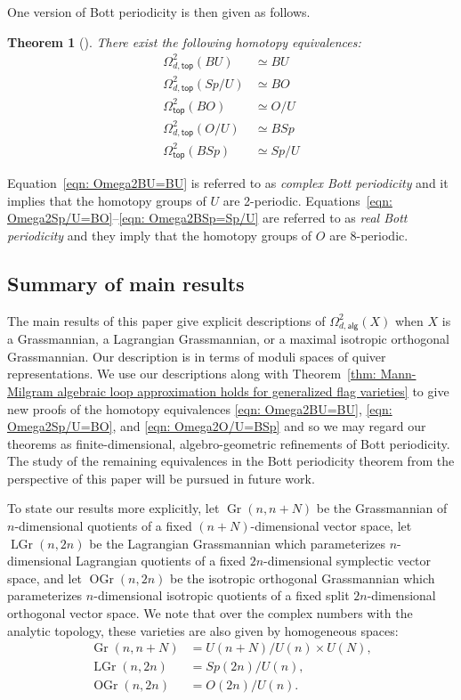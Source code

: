 \message{ !name(Bryan-Vakil.tex)}\documentclass{amsart}
\newtheorem{theorem}{Theorem}[section]
\theoremstyle{definition}
\newcommand{\alg}{\mathsf{alg}}
\renewcommand{\top}{\mathsf{top}}
\newcommand{\Gr}{\operatorname{Gr}}
\newcommand{\LGr}{\operatorname{LGr}}
\newcommand{\OGr}{\operatorname{OGr}}
\newcommand{\LoopTwo}{\Omega^{2}_{d,\alg}}
\newcommand{\LoopTwoTop}{\Omega^{2}_{d,\top}}
\newcommand{\NoDLoopTwoTop}{\Omega^{2}_{\top}}
\newcommand{\homotopyeq}{\simeq}
\begin{document}
One version of Bott periodicity is then given as follows.

\begin{theorem}[\cite{Bott-Periodicity-1959}]\label{thm: classical Bott periodicity as homotopy equivalences}
There exist the following homotopy equivalences:
\begin{align}
\LoopTwoTop (BU)&\homotopyeq BU \label{eqn: Omega2BU=BU}\\
\LoopTwoTop (Sp/U)&\homotopyeq BO  \label{eqn: Omega2Sp/U=BO}\\
\NoDLoopTwoTop (BO)&\homotopyeq O/U  \label{eqn: Omega2BO=O/U}\\
\LoopTwoTop (O/U)&\homotopyeq BSp  \label{eqn: Omega2O/U=BSp}\\
\NoDLoopTwoTop (BSp)&\homotopyeq Sp/U   \label{eqn: Omega2BSp=Sp/U}
\end{align}
\end{theorem}

Equation~\eqref{eqn: Omega2BU=BU} is referred to as \emph{complex Bott
periodicity} and it implies that the homotopy groups of $U$ are
2-periodic. Equations~\eqref{eqn: Omega2Sp/U=BO}--\eqref{eqn: Omega2BSp=Sp/U} 
are referred to as \emph{real Bott periodicity} and they imply that
the homotopy groups of $O$ are 8-periodic.

\subsection{Summary of main results}

The main results of this paper give explicit descriptions of $\LoopTwo
(X)$ when $X$ is a Grassmannian, a Lagrangian Grassmannian, or a maximal
isotropic orthogonal Grassmannian. Our description is in terms of
moduli spaces of quiver representations. We use our descriptions along
with Theorem~\ref{thm: Mann-Milgram algebraic loop approximation
holds for generalized flag varieties} to give new proofs of the
homotopy equivalences \eqref{eqn: Omega2BU=BU}, \eqref{eqn:
Omega2Sp/U=BO}, and \eqref{eqn: Omega2O/U=BSp} and so we may regard
our theorems as finite-dimensional, algebro-geometric refinements of Bott
periodicity. The study of the remaining equivalences in the Bott
periodicity theorem from the perspective of this paper will be pursued
in future work.

To state our results more explicitly, let $ \Gr(n,n+N) $ be the
Grassmannian of $n$-dimensional quotients of a fixed $(n+N)$-dimensional
vector space, let $ \LGr (n,2n) $ be the Lagrangian Grassmannian which
parameterizes $n$-dimensional Lagrangian quotients of a fixed
$2n$-dimensional symplectic vector space, and let $ \OGr (n,2n) $ be
the isotropic orthogonal Grassmannian which parameterizes
$n$-dimensional isotropic quotients of a fixed split $2n$-dimensional
orthogonal vector space. We note that over the complex numbers with
the analytic topology, these varieties are also given by homogeneous
spaces:
\begin{align*}
\Gr (n,n+N)&=U(n+N)/U(n)\times U(N),\\
\LGr (n,2n)&= Sp(2n)/U(n),\\
\OGr (n,2n)&= O(2n)/U(n) .
\end{align*}
\end{document}
